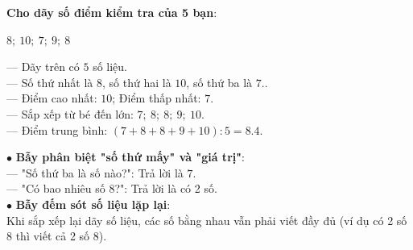 \documentclass[14pt,a4paper,oneside]{extbook}
\begin{document}
\noindent
\begin{minipage}[t]{0.53\textwidth}
  \begin{tcolorbox}[
    enhanced,
    title={\footnotesize\bfseries\color{white}\faCheckCircle\ Ví dụ thực hành chuẩn mực},
    colback=green!2!white,
    colframe=green!60!black,
    arc=2.5mm, boxrule=0.8pt, top=1.8mm, bottom=1.8mm, left=2.2mm, right=2.2mm
  ]
    \footnotesize
    \textbf{Cho dãy số điểm kiểm tra của 5 bạn}:\\
    \begin{center}
      $8;\ 10;\ 7;\ 9;\ 8$
    \end{center}
    --- Dãy trên có $5$ số liệu.\\
    --- Số thứ nhất là $8$, số thứ hai là $10$, số thứ ba là $7$..\\
    --- Điểm cao nhất: $10$; Điểm thấp nhất: $7$.\\
    --- Sắp xếp từ bé đến lớn: $7;\ 8;\ 8;\ 9;\ 10$.\\
    --- Điểm trung bình: $(7 + 8 + 8 + 9 + 10) : 5 = \mathbf{8.4}$.
  \end{tcolorbox}
\end{minipage}%
\hfill
\begin{minipage}[t]{0.45\textwidth}
  \begin{tcolorbox}[
    enhanced,
    title={\footnotesize\bfseries\color{white}\faExclamationTriangle\ Mẹo tránh bẫy trắc nghiệm},
    colback=red!2!white,
    colframe=red!70!black,
    arc=2.5mm, boxrule=0.8pt, top=1.8mm, bottom=1.8mm, left=2.2mm, right=2.2mm
  ]
    \footnotesize
    $\bullet$ \textbf{Bẫy phân biệt "số thứ mấy" và "giá trị"}:\\
    --- "Số thứ ba là số nào?": Trả lời là $7$.\\
    --- "Có bao nhiêu số 8?": Trả lời là có 2 số.\\
    $\bullet$ \textbf{Bẫy đếm sót số liệu lặp lại}:\\
    Khi sắp xếp lại dãy số liệu, các số bằng nhau vẫn phải viết đầy đủ (ví dụ có 2 số 8 thì viết cả 2 số 8).
  \end{tcolorbox}
\end{minipage}
\end{document}

